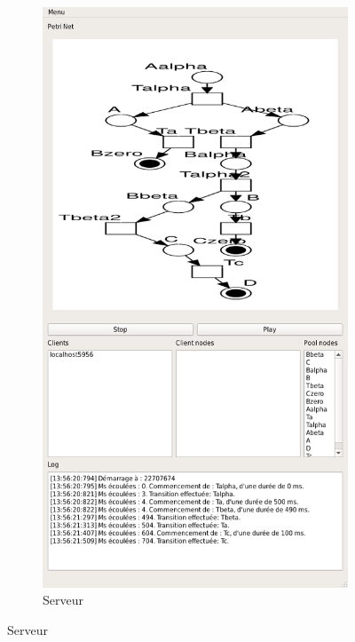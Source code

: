 	
	\begin{figure}
		\centering
		\begin{subfigure}{0.5\textwidth}
			\centering
			\includegraphics[scale=0.3]{images/resultats/server_algo_wifi.png}
			\caption{Serveur}
		\end{subfigure}
		
		\vspace{1cm}
		

\end{figure}

